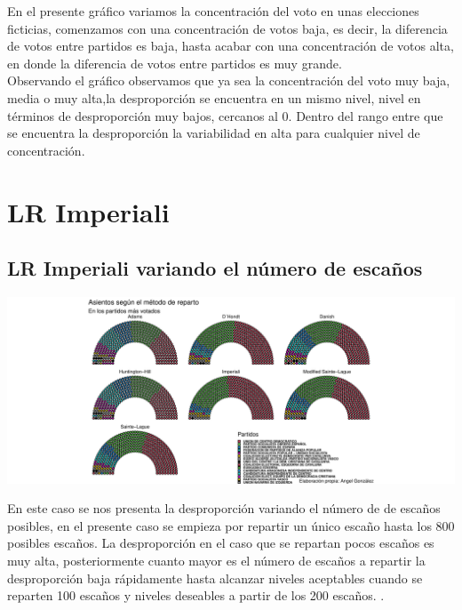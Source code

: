 \documentclass[12pt,a4paper,]{book}
\numberwithin{dummy}{section}
\theoremstyle{ocrenumbox}
\theoremstyle{blacknumex}
\theoremstyle{blacknumbox}
\theoremstyle{ocrenum}
\theoremstyle{ocrenum}
\begin{document}
En el presente gráfico variamos la concentración del voto en unas
elecciones ficticias, comenzamos con una concentración de votos baja, es
decir, la diferencia de votos entre partidos es baja, hasta acabar con
una concentración de votos alta, en donde la diferencia de votos entre
partidos es muy grande.\\
Observando el gráfico observamos que ya sea la concentración del voto
muy baja, media o muy alta,la desproporción se encuentra en un mismo
nivel, nivel en términos de desproporción muy bajos, cercanos al 0.
Dentro del rango entre que se encuentra la desproporción la variabilidad
en alta para cualquier nivel de concentración.

\hypertarget{lr-imperiali}{%
\section{LR Imperiali}\label{lr-imperiali}}

\hypertarget{lr-imperiali-variando-el-nuxfamero-de-escauxf1os}{%
\subsection{LR Imperiali variando el número de
escaños}\label{lr-imperiali-variando-el-nuxfamero-de-escauxf1os}}

\begin{center}\includegraphics[width=0.95\linewidth]{figurasR/unnamed-chunk-61-1} \end{center}

En este caso se nos presenta la desproporción variando el número de de
escaños posibles, en el presente caso se empieza por repartir un único
escaño hasta los 800 posibles escaños. La desproporción en el caso que
se repartan pocos escaños es muy alta, posteriormente cuanto mayor es el
número de escaños a repartir la desproporción baja rápidamente hasta
alcanzar niveles aceptables cuando se reparten 100 escaños y niveles
deseables a partir de los 200 escaños. .
\end{document}
